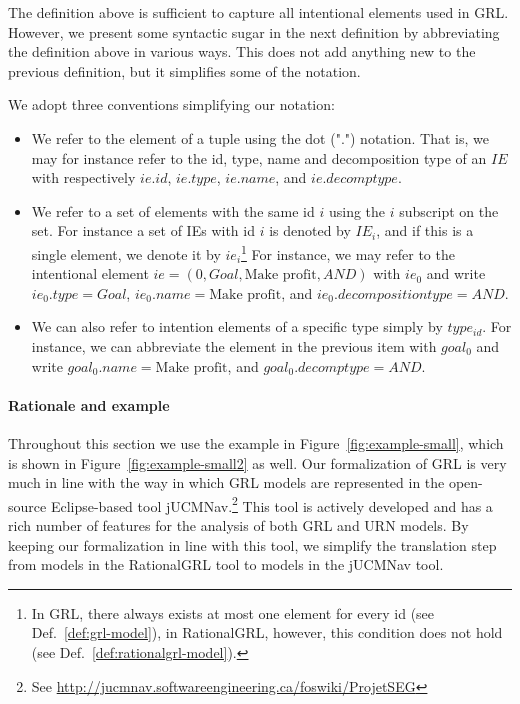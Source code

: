 The definition above is sufficient to capture all intentional elements used in GRL. However, we present some syntactic sugar in the next definition by abbreviating the definition above in various ways. This does not add anything new to the previous definition, but it simplifies some of the notation.

\begin{definition}[Notation]
\label{def:notation}
We adopt three conventions simplifying our notation:
\begin{itemize}
\item
We refer to the element of a tuple using the dot (".") notation. That is, we may for instance refer to the id, type, name and decomposition type of an $IE$ with respectively $ie.id$, $ie.type$, $ie.name$, and $ie.decomptype$.
\item 
We refer to a set of elements with the same id $i$  using the $i$ subscript on the set. For instance a set of IEs with id $i$ is denoted by $IE_i$, and if this is a single element, we denote it by $ie_i$\footnote{In GRL, there always exists at most one element for every id (see Def.~\ref{def:grl-model}), in RationalGRL, however, this condition does not hold (see Def.~\ref{def:rationalgrl-model}).} For instance, we may refer to the intentional element $ie = (0, Goal, \text{Make profit}, AND)$ with $ie_0$ and write $ie_0.type = Goal$, $ie_0.name = \text{Make profit}$, and $ie_0.decompositiontype = AND$. 
\item
We can also refer to intention elements of a specific type simply by $type_{id}$. For instance, we can abbreviate the element in the previous item with $goal_0$ and write $goal_0.name = \text{Make profit}$, and $goal_0.decomptype = AND$.
\end{itemize}
\end{definition}

\paragraph{Rationale and example} Throughout this section we use the example in Figure~\ref{fig:example-small}, which is shown in Figure~\ref{fig:example-small2} as well. Our formalization of GRL is very much in line with the way in which GRL models are represented in the open-source Eclipse-based tool jUCMNav.\footnote{See \url{http://jucmnav.softwareengineering.ca/foswiki/ProjetSEG}} This tool is actively developed and has a rich number of features for the analysis of both GRL and URN models. By keeping our formalization in line with this tool, we simplify the translation step from models in the RationalGRL tool to models in the jUCMNav tool.

